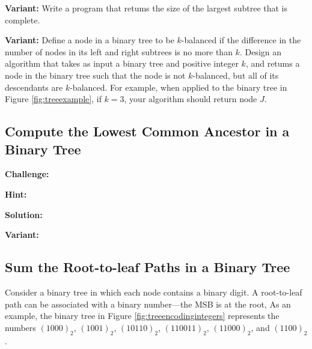 \documentclass[11pt,a4paper]{article}
\begin{document}
\textbf{Variant:} Write a program that retums the size of the largest subtree
that is complete.

\textbf{Variant:} Define a node in a binary tree to be $k$-balanced if the
difference in the number of nodes in its left and right subtrees is no more than
$k$. Design an algorithm that takes as input a binary tree and positive integer
$k$, and retums a node in the binary tree such that the node is not
$k$-balanced, but all of its descendants are $k$-balanced. For example, when
applied to the binary tree in Figure \ref{fig:treeexample}, if $k = 3$, your
algorithm should return node $J$.

\subsection{Compute the Lowest Common Ancestor in a Binary Tree}

\textbf{Challenge:} 

\textbf{Hint:} 

\textbf{Solution:} 

\textbf{Variant:} 

\subsection{Sum the Root-to-leaf Paths in a Binary Tree}

Consider a binary tree in which each node contains a binary digit. A
root-to-leaf path can be associated with a binary number---the MSB is at the
root, As an example, the binary tree in Figure \ref{fig:treeencodingintegers}
represents the numbers $(1000)_2$, $(1001)_2$, $(10110)_2$, $(110011)_2$,
$(11000)_2$, and $(1100)_2$.
\end{document}
